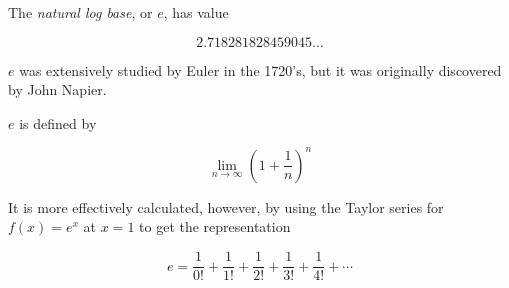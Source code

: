 \documentclass{article}
\begin{document}
The \emph{natural log base}, or $e$, has value 

\[ 2.718281828459045\ldots \]

$e$ was extensively studied by Euler in the 1720's, but it was originally discovered by John Napier. 

$e$ is defined by 

\[ \lim_{n \rightarrow \infty} \left(1+\frac{1}{n}\right)^n \]

It is more effectively calculated, however, by using the Taylor series for $f(x)=e^x$ at $x=1$ to get the representation 

\[ e = \frac{1}{0!} + \frac{1}{1!} + \frac{1}{2!} + \frac{1}{3!} + \frac{1}{4!} + \cdots \]
\end{document}

